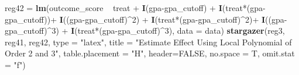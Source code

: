 \documentclass[]{article}
\newenvironment{Shaded}{\begin{snugshade}}{\end{snugshade}}
\newcommand{\KeywordTok}[1]{\textcolor[rgb]{0.13,0.29,0.53}{\textbf{{#1}}}}
\newcommand{\DataTypeTok}[1]{\textcolor[rgb]{0.13,0.29,0.53}{{#1}}}
\newcommand{\DecValTok}[1]{\textcolor[rgb]{0.00,0.00,0.81}{{#1}}}
\newcommand{\StringTok}[1]{\textcolor[rgb]{0.31,0.60,0.02}{{#1}}}
\newcommand{\OtherTok}[1]{\textcolor[rgb]{0.56,0.35,0.01}{{#1}}}
\newcommand{\NormalTok}[1]{{#1}}
\begin{document}
\begin{Shaded}
\begin{Highlighting}[]
\NormalTok{reg42 =}\StringTok{ }\KeywordTok{lm}\NormalTok{(outcome_score ~}\StringTok{ }\NormalTok{treat +}\StringTok{ }\KeywordTok{I}\NormalTok{(gpa-gpa_cutoff) +}\StringTok{ }\KeywordTok{I}\NormalTok{(treat*(gpa-gpa_cutoff))+}
\StringTok{             }\KeywordTok{I}\NormalTok{((gpa-gpa_cutoff)^}\DecValTok{2}\NormalTok{) +}\StringTok{ }\KeywordTok{I}\NormalTok{(treat*(gpa-gpa_cutoff)^}\DecValTok{2}\NormalTok{)+}
\StringTok{             }\KeywordTok{I}\NormalTok{((gpa-gpa_cutoff)^}\DecValTok{3}\NormalTok{) +}\StringTok{ }\KeywordTok{I}\NormalTok{(treat*(gpa-gpa_cutoff)^}\DecValTok{3}\NormalTok{), }\DataTypeTok{data =} \NormalTok{data)}
\KeywordTok{stargazer}\NormalTok{(reg3, reg41, reg42, }\DataTypeTok{type =} \StringTok{"latex"}\NormalTok{, }\DataTypeTok{title =} \StringTok{"Estimate Effect Using Local Polynomial of Order 2 and 3"}\NormalTok{,}
          \DataTypeTok{table.placement =} \StringTok{"H"}\NormalTok{, }\DataTypeTok{header=}\OtherTok{FALSE}\NormalTok{, }\DataTypeTok{no.space =} \NormalTok{T, }\DataTypeTok{omit.stat =} \StringTok{"f"}\NormalTok{)}
\end{Highlighting}
\end{Shaded}
\end{document}
